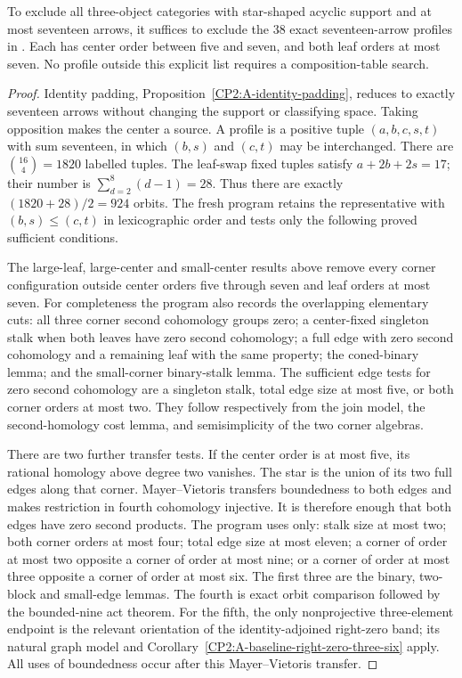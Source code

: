 \begin{proposition}
\label{CP2:A-star-seventeen-scope}
To exclude all three-object categories with star-shaped acyclic
support and at most seventeen arrows, it suffices to exclude
the $38$ exact seventeen-arrow profiles in
.
Each has center order between five and seven, and both leaf
orders at most seven. No profile outside this explicit list
requires a composition-table search.
\end{proposition}
\begin{proof}
Identity padding, Proposition~\ref{CP2:A-identity-padding},
reduces to exactly seventeen arrows without changing the
support or classifying space. Taking opposition makes the
center a source. A profile is a positive tuple
$(a,b,c,s,t)$ with sum seventeen, in which $(b,s)$ and
$(c,t)$ may be interchanged. There are
$\binom{16}{4}=1820$ labelled tuples. The leaf-swap fixed
tuples satisfy $a+2b+2s=17$; their number is
$\sum_{d=2}^{8}(d-1)=28$. Thus there are exactly
$(1820+28)/2=924$ orbits. The fresh program
 retains the representative
with $(b,s)\le(c,t)$ in lexicographic order and tests only
the following proved sufficient conditions.

The large-leaf, large-center and small-center results above
remove every corner configuration outside center orders
five through seven and leaf orders at most seven.
For completeness the program also records the overlapping
elementary cuts: all three corner second cohomology groups
zero; a center-fixed singleton stalk when both leaves have
zero second cohomology; a full edge with zero second
cohomology and a remaining leaf with the same property;
the coned-binary lemma; and the small-corner binary-stalk
lemma. The sufficient edge tests for zero second cohomology
are a singleton stalk, total edge size at most five, or
both corner orders at most two. They follow respectively
from the join model, the second-homology cost lemma, and
semisimplicity of the two corner algebras.

There are two further transfer tests. If the center order
is at most five, its rational homology above degree two
vanishes. The star is the union of its two full edges
along that corner. Mayer--Vietoris transfers boundedness
to both edges and makes restriction in fourth cohomology
injective. It is therefore enough that both edges have
zero second products. The program uses only: stalk size
at most two; both corner orders at most four; total edge
size at most eleven; a corner of order at most two opposite
a corner of order at most nine; or a corner of order at
most three opposite a corner of order at most six.
The first three are the binary, two-block and small-edge
lemmas. The fourth is exact orbit comparison followed by
the bounded-nine act theorem. For the fifth, the only
nonprojective three-element endpoint is the relevant
orientation of the identity-adjoined right-zero band;
its natural graph model and
Corollary~\ref{CP2:A-baseline-right-zero-three-six} apply.
All uses of boundedness occur after this Mayer--Vietoris
transfer.


\end{proof}
